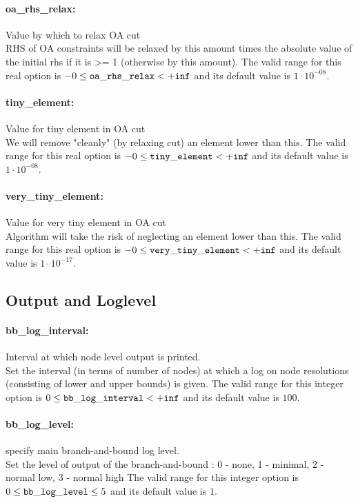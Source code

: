 \paragraph{oa\_rhs\_relax:}\label{opt:oa_rhs_relax} Value by which to relax OA cut \\
 RHS of OA constraints will be relaxed by this amount times the absolute value of the initial rhs if it is >= 1 (otherwise by this amount). The valid range for this real option is 
$-0 \le {\tt oa\_rhs\_relax } <  {\tt +inf}$
and its default value is $1 \cdot 10^{-08}$.


\paragraph{tiny\_element:}\label{opt:tiny_element} Value for tiny element in OA cut \\
 We will remove "cleanly" (by relaxing cut) an element lower than this. The valid range for this real option is 
$-0 \le {\tt tiny\_element } <  {\tt +inf}$
and its default value is $1 \cdot 10^{-08}$.


\paragraph{very\_tiny\_element:}\label{opt:very_tiny_element} Value for very tiny element in OA cut \\
 Algorithm will take the risk of neglecting an element lower than this. The valid range for this real option is 
$-0 \le {\tt very\_tiny\_element } <  {\tt +inf}$
and its default value is $1 \cdot 10^{-17}$.


\subsection{Output and Loglevel}
\label{sec:OutputandLoglevel}
\paragraph{bb\_log\_interval:}\label{opt:bb_log_interval} Interval at which node level output is printed. \\
 Set the interval (in terms of number of nodes) at which a log on node resolutions (consisting of lower and upper bounds) is given. The valid range for this integer option is
$0 \le {\tt bb\_log\_interval } <  {\tt +inf}$
and its default value is $100$.


\paragraph{bb\_log\_level:}\label{opt:bb_log_level} specify main branch-and-bound log level. \\
 Set the level of output of the branch-and-bound : 0 - none, 1 - minimal, 2 - normal low, 3 - normal high The valid range for this integer option is
$0 \le {\tt bb\_log\_level } \le 5$
and its default value is $1$.


